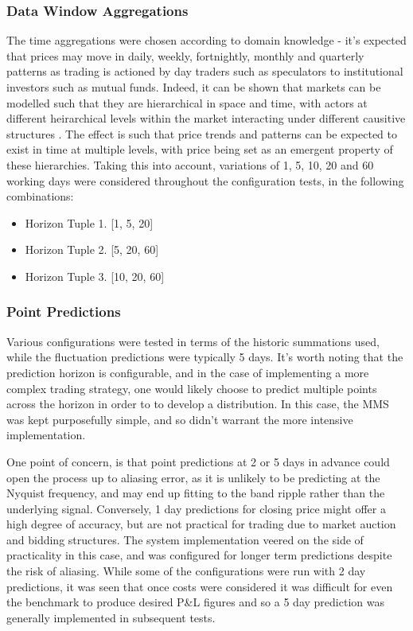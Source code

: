 \documentclass[a4paper,11pt,oneside]{article}
\theoremstyle{plain}
\theoremstyle{definition}
\begin{document}
	\subsubsection{Data Window Aggregations} The time aggregations were chosen according to domain knowledge - it's expected that prices may move in daily, weekly, fortnightly, monthly and quarterly patterns as trading is actioned by day traders such as speculators to institutional investors such as mutual funds. Indeed, it can be shown that markets can be modelled such that they are hierarchical in space and time, with actors at different heirarchical levels within the market interacting under different causitive structures \cite{Wilcox}. The effect is such that price trends and patterns can be expected to exist in time at multiple levels, with price being set as an emergent property of these hierarchies. Taking this into account, variations of 1, 5, 10, 20 and 60 working days were considered throughout the configuration tests, in the following combinations:  
	\begin{itemize}
		\item[] Horizon Tuple 1. [1, 5, 20]
		\item[] Horizon Tuple 2. [5, 20, 60]
		\item[] Horizon Tuple 3. [10, 20, 60]
	\end{itemize}
	
	\subsubsection {Point Predictions} Various configurations were tested in terms of the historic summations used, while the fluctuation predictions were typically 5 days. It's worth noting that the prediction horizon is configurable, and in the case of implementing a more complex trading strategy, one would likely choose to predict multiple points across the horizon in order to to develop a distribution. In this case, the MMS was kept purposefully simple, and so didn't warrant the more intensive implementation. \newline
	
	One point of concern, is that point predictions at 2 or 5 days in advance could open the process up to aliasing error, as it is unlikely to be predicting at the Nyquist frequency, and may end up fitting to the band ripple rather than the underlying signal. Conversely, 1 day predictions for closing price might offer a high degree of accuracy, but are not practical for trading due to market auction and bidding structures. The system implementation veered on the side of practicality in this case, and was configured for longer term predictions despite the risk of aliasing. While some of the configurations were run with 2 day predictions, it was seen that once costs were considered it was difficult for even the benchmark to produce desired P\&L figures and so a 5 day prediction was generally implemented in subsequent tests.
	
\end{document}
